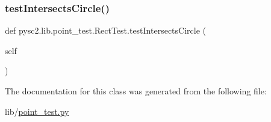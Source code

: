\subsubsection{\texorpdfstring{test\+Intersects\+Circle()}{testIntersectsCircle()}}
{\footnotesize\ttfamily def pysc2.\+lib.\+point\+\_\+test.\+Rect\+Test.\+test\+Intersects\+Circle (\begin{DoxyParamCaption}\item[{}]{self }\end{DoxyParamCaption})}



The documentation for this class was generated from the following file\+:\begin{DoxyCompactItemize}
\item 
lib/\mbox{\hyperlink{point__test_8py}{point\+\_\+test.\+py}}\end{DoxyCompactItemize}

